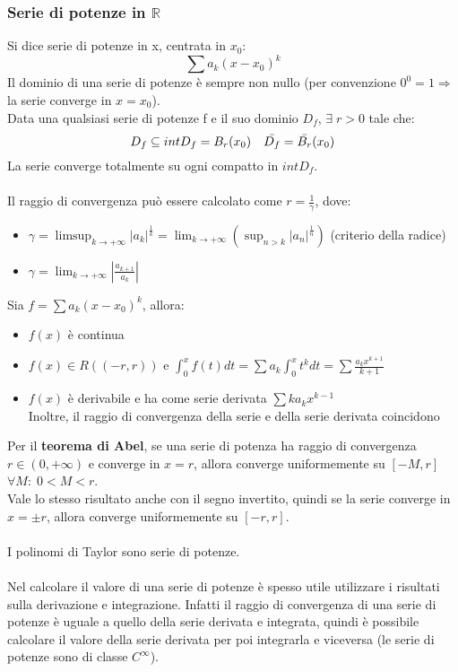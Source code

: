 \documentclass{article}
\newcommand{\R}{\mathds{R}}
\begin{document}
\subsubsection{Serie di potenze in $\R$}
Si dice serie di potenze in x, centrata in $x_0$:
$$ \sum a_k(x-x_0)^k $$
Il dominio di una serie di potenze è sempre non nullo (per convenzione $0^0=1\Rightarrow$ la serie converge in $x=x_0$).\\
Data una qualsiasi serie di potenze f e il suo dominio $D_f$, $\exists\;r>0$ tale che:
$$ D_f\subseteq int D_f=B_r(x_0)\quad \Bar{D_f}=\Bar{B_r}(x_0) $$
La serie converge totalmente su ogni compatto in $int D_f$.\\\\
Il raggio di convergenza può essere calcolato come $r=\frac{1}{\gamma}$, dove:
\begin{itemize}
    \item $\gamma=\limsup_{k\rightarrow+\infty}|a_k|^{\frac{1}{k}}=\lim_{k\rightarrow+\infty}(\sup_{n>k}|a_n|^\frac{1}{n})$ (criterio della radice)
    \item $\gamma=\lim_{k\rightarrow+\infty}\left| \frac{a_{k+1}}{a_k} \right|$
\end{itemize}
Sia $f=\sum a_k(x-x_0)^k$, allora:
\begin{itemize}
    \item $f(x)$ è continua
    \item $f(x)\in R((-r,r))$ e $\int_0^xf(t)dt=\sum a_k\int_0^xt^kdt=\sum\frac{a_kx^{k+1}}{k+1}$
    \item $f(x)$ è derivabile e ha come serie derivata $\sum ka_kx^{k-1}$\\
    Inoltre, il raggio di convergenza della serie e della serie derivata coincidono
\end{itemize}
Per il \textbf{teorema di Abel}, se una serie di potenza ha raggio di convergenza $r\in(0,+\infty)$ e converge in $x=r$, allora converge uniformemente su $[-M,r]$ $\forall M:\;0<M<r$.\\
Vale lo stesso risultato anche con il segno invertito, quindi se la serie converge in $x=\pm r$, allora converge uniformemente su $[-r,r]$.\\\\
I polinomi di Taylor sono serie di potenze.\\\\
Nel calcolare il valore di una serie di potenze è spesso utile utilizzare i risultati sulla derivazione e integrazione. Infatti il raggio di convergenza di una serie di potenze è uguale a quello della serie derivata e integrata, quindi è possibile calcolare il valore della serie derivata per poi integrarla e viceversa (le serie di potenze sono di classe $C^\infty$).\\\\
\end{document}
